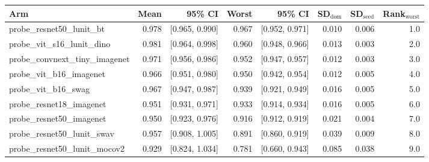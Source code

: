 \begin{tabular}{lrrrrrrr}
\toprule
Arm & Mean & 95\% CI & Worst & 95\% CI & SD$_\text{dom}$ & SD$_\text{seed}$ & Rank$_\text{worst}$ \\
\midrule
probe\_resnet50\_lunit\_bt & 0.978 & [0.965, 0.990] & 0.967 & [0.952, 0.971] & 0.010 & 0.006 & 1.0 \\
probe\_vit\_s16\_lunit\_dino & 0.981 & [0.964, 0.998] & 0.960 & [0.948, 0.966] & 0.013 & 0.003 & 2.0 \\
probe\_convnext\_tiny\_imagenet & 0.971 & [0.956, 0.986] & 0.952 & [0.947, 0.957] & 0.012 & 0.003 & 3.0 \\
probe\_vit\_b16\_imagenet & 0.966 & [0.951, 0.980] & 0.950 & [0.942, 0.954] & 0.012 & 0.005 & 4.0 \\
probe\_vit\_b16\_swag & 0.967 & [0.947, 0.987] & 0.939 & [0.921, 0.949] & 0.016 & 0.005 & 5.0 \\
probe\_resnet18\_imagenet & 0.951 & [0.931, 0.971] & 0.933 & [0.914, 0.934] & 0.016 & 0.005 & 6.0 \\
probe\_resnet50\_imagenet & 0.950 & [0.923, 0.976] & 0.916 & [0.912, 0.919] & 0.021 & 0.004 & 7.0 \\
probe\_resnet50\_lunit\_swav & 0.957 & [0.908, 1.005] & 0.891 & [0.860, 0.919] & 0.039 & 0.009 & 8.0 \\
probe\_resnet50\_lunit\_mocov2 & 0.929 & [0.824, 1.034] & 0.781 & [0.660, 0.943] & 0.085 & 0.038 & 9.0 \\
\bottomrule
\end{tabular}
